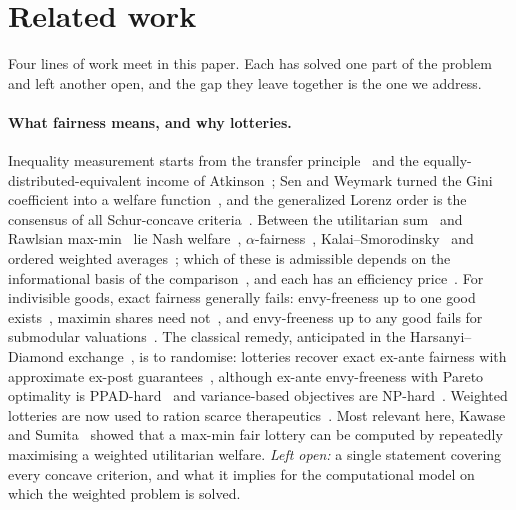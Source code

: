 \documentclass[11pt,a4paper]{article}
\begin{document}
\section{Related work}\label{sec:related}

Four lines of work meet in this paper. Each has solved one part of the problem and left another
open, and the gap they leave together is the one we address.

\paragraph{What fairness means, and why lotteries.}
Inequality measurement starts from the transfer principle~\cite{dalton1920measurement} and the
equally-distributed-equivalent income of Atkinson~\cite{atkinson1970measurement}; Sen and Weymark
turned the Gini coefficient into a welfare function~\cite{sen1973economic,weymark1981generalized},
and the generalized Lorenz order is the consensus of all Schur-concave
criteria~\cite{shorrocks1983ranking,marshall2011inequalities}. Between the utilitarian
sum~\cite{harsanyi1955cardinal} and Rawlsian max-min~\cite{rawls1971theory} lie Nash
welfare~\cite{nash1950bargaining,kaneko1979nash}, $\alpha$-fairness~\cite{mo2000fair},
Kalai--Smorodinsky~\cite{kalai1975other} and ordered weighted averages~\cite{yager1988ordered};
which of these is admissible depends on the informational basis of the
comparison~\cite{hammond1976equity,daspremont1977equity}, and each has an efficiency
price~\cite{bertsimas2011price}. For indivisible goods, exact fairness generally fails: envy-freeness
up to one good exists~\cite{lipton2004approximately,budish2011combinatorial}, maximin shares need
not~\cite{kurokawa2018fair}, and envy-freeness up to any good fails for submodular
valuations~\cite{akrami2026counterexample}. The classical remedy, anticipated in the
Harsanyi--Diamond exchange~\cite{harsanyi1955cardinal,diamond1967cardinal}, is to randomise:
lotteries recover exact ex-ante fairness with approximate ex-post
guarantees~\cite{aziz2024best}, although ex-ante envy-freeness with Pareto optimality is
PPAD-hard~\cite{caragiannis2023complexity} and variance-based objectives are
NP-hard~\cite{babaioff2026best}. Weighted lotteries are now used to ration scarce
therapeutics~\cite{white2022multicenter,pathak2024fair}. Most relevant here, Kawase and
Sumita~\cite{kawase2020maxmin} showed that a max-min fair lottery can be computed by repeatedly
maximising a weighted utilitarian welfare. \emph{Left open:} a single statement covering every concave
criterion, and what it implies for the computational model on which the weighted problem is solved.
\end{document}
